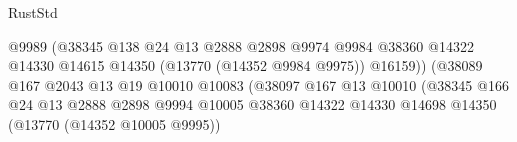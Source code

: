 \begin{lexlean}{RustStd}
\begin{coremodule}
                                                      @9989
                                                      (@38345
                                                        @138
                                                        @24
                                                        @13
                                                        @2888
                                                        @2898
                                                        @9974
                                                        @9984
                                                        @38360
                                                        @14322
                                                        @14330
                                                        @14615
                                                        @14350
                                                        (@13770 (@14352 @9984 @9975))
                                                        @16159))
                                                    (@38089
                                                      @167
                                                      @2043
                                                      @13
                                                      @19
                                                      @10010
                                                      @10083
                                                      (@38097
                                                        @167
                                                        @13
                                                        @10010
                                                        (@38345
                                                          @166
                                                          @24
                                                          @13
                                                          @2888
                                                          @2898
                                                          @9994
                                                          @10005
                                                          @38360
                                                          @14322
                                                          @14330
                                                          @14698
                                                          @14350
                                                          (@13770 (@14352 @10005 @9995))

\end{coremodule}
\end{lexlean}
